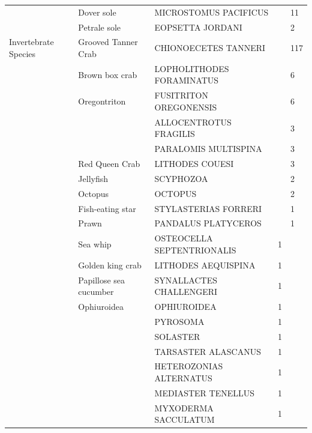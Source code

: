 \documentclass[12pt]{article}\usepackage[]{graphicx}\usepackage[]{color}
\begin{document}
\begin{table}[!h]
\begin{tabular}[t]{lllrl}
 & Dover sole & MICROSTOMUS PACIFICUS &  & 11\\
 & Petrale sole & EOPSETTA JORDANI &  & 2\\
\midrule
Invertebrate Species & Grooved Tanner Crab & CHIONOECETES TANNERI &  & 117\\
 & Brown box crab & LOPHOLITHODES FORAMINATUS &  & 6\\
 & Oregontriton & FUSITRITON OREGONENSIS &  & 6\\
 &  & ALLOCENTROTUS FRAGILIS &  & 3\\
 &  & PARALOMIS MULTISPINA &  & 3\\
 & Red Queen Crab & LITHODES COUESI &  & 3\\
 & Jellyfish & SCYPHOZOA &  & 2\\
 & Octopus & OCTOPUS &  & 2\\
 & Fish-eating star & STYLASTERIAS FORRERI &  & 1\\
 & Prawn & PANDALUS PLATYCEROS &  & 1\\
 & Sea whip & OSTEOCELLA SEPTENTRIONALIS & 1 & \\
 & Golden king crab & LITHODES AEQUISPINA & 1 & \\
 & Papillose sea cucumber & SYNALLACTES CHALLENGERI & 1 & \\
 & Ophiuroidea & OPHIUROIDEA & 1 & \\
 &  & PYROSOMA & 1 & \\
 &  & SOLASTER & 1 & \\
 &  & TARSASTER ALASCANUS & 1 & \\
 &  & HETEROZONIAS ALTERNATUS & 1 & \\
 &  & MEDIASTER TENELLUS & 1 & \\
 &  & MYXODERMA SACCULATUM & 1 & \\
\bottomrule
\end{tabular}
\end{table}
\clearpage
\end{document}
